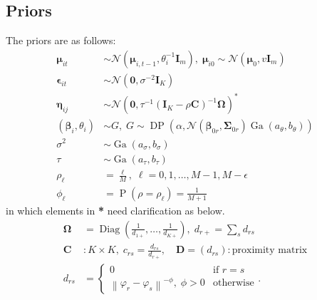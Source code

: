 \documentclass[11pt]{article}
\newcommand{\bs}{\boldsymbol}
\newcommand{\opn}{\operatorname}
\begin{document}
  \subsection{Priors}
  The priors are as follows:
  \begin{align}
    \bs{\mu}_{it} &\sim \mathcal{N}\left(\bs{\mu}_{i,t-1}, \theta_{i}^{-1}\mathbf{I}_{m}\right), \; \bs{\mu}_{i0} \sim \mathcal{N}\left(\bs{\mu}_{0}, v\mathbf{I}_{m}\right)\\
    \bs{\epsilon}_{it} &\sim \mathcal{N}\left(\bs{0}, \sigma^{-2}\mathbf{I}_{K}\right)\\
    \bs{\eta}_{ij} &\sim \mathcal{N}\left(\bs{0}, \tau^{-1}\left(\mathbf{I}_{K}-\rho \mathbf{C}\right)^{-1}\bs{\Omega}\right)^{\textbf{*}}\\
    \left(\bs{\beta}_{i}, \theta_{i}\right) &\sim G, \; G \sim \opn{DP}\left(\alpha, \mathcal{N}\left(\bs{\beta}_{0r}, \bs{\Sigma}_{0r}\right)\opn{Ga}\left(a_{\theta}, b_{\theta}\right)\right)\\
    \sigma^{2} &\sim \opn{Ga}\left(a_{\sigma}, b_{\sigma}\right)\\
    \tau &\sim \opn{Ga}\left(a_{\tau}, b_{\tau}\right)\\
    \rho_{\ell}&= \frac{\ell}{M}, \; \ell = 0, 1, \ldots , M-1, M-\epsilon\\
    \phi_{\ell} &= \opn{P}\left(\rho = \rho_{\ell}\right) = \frac{1}{M+1}
  \end{align}
in which elements in \textbf{*} need clarification as below.
\begin{align}
  \bs{\Omega} &= \opn{Diag}\left(\frac{1}{d_{1+}}, \ldots , \frac{1}{d_{K+}}\right), \; d_{r+} = \sum_{s} d_{rs}\\
  \mathbf{C}&:K \times K, \; c_{rs} = \frac{d_{rs}}{d_{r+}}, \quad \mathbf{D} = \left(d_{rs}\right): \text{proximity matrix}\\
  d_{rs} &= \begin{cases}0 & \text{if $r=s$}\\ \left\| \varphi_{r}-\varphi_{s}\right\|^{-\phi},\; \phi > 0 & \text{otherwise}  \end{cases}.
\end{align}
\end{document}
